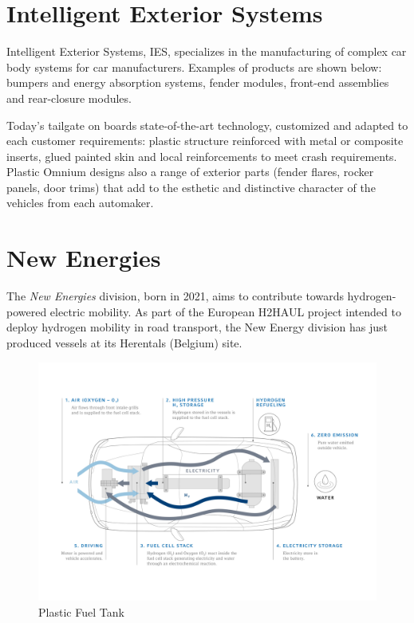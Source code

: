 \section{Intelligent Exterior Systems}

Intelligent Exterior Systems, IES, specializes in the manufacturing of complex car
body systems for car manufacturers. Examples of products are shown below: bumpers and
energy absorption systems, fender modules, front-end assemblies and rear-closure modules.

Today’s tailgate on boards state-of-the-art technology, customized and adapted to each customer requirements: plastic structure reinforced with metal or composite inserts, glued painted skin and local reinforcements to meet crash requirements.
Plastic Omnium designs also a range of exterior parts (fender flares, rocker panels, door trims) that add to the esthetic and distinctive character of the vehicles from each automaker.

\section{New Energies}

The \textit{New Energies} division, born in 2021, aims to contribute towards hydrogen-powered electric mobility. As part of the European H2HAUL project intended to deploy hydrogen mobility in road transport, the New Energy division has just produced vessels at its Herentals (Belgium) site. 

\begin{figure}
\centerline{\includegraphics[scale=0.2]{images/appendix_A/plastic-omnium-voiture-zero-emission-legendes-scaled.jpg}}
\caption{Plastic Fuel Tank}
\label{fig:Plastic Fuel Tank}
\end{figure}
